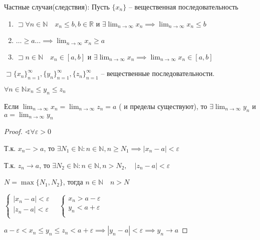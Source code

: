 \documentclass{book}
\newcommand\N{\ensuremath{\mathbb{N}}}
\newcommand\R{\ensuremath{\mathbb{R}}}
\theoremstyle{definition}
\begin{document}
    Частные случаи(следствия):
    Пусть $\{x_n\}$ -- вещественная последовательность
    \begin{enumerate}
        \item $\sqsupset \forall n\in \N \quad x_n\leqslant b, b\in \R$ и $\exists \lim_{n \to \infty} x_n \implies \lim_{n \to \infty} x_n\leqslant b$
        \item $\ldots \geqslant a \ldots \implies  \lim_{n \to \infty} x_n\geqslant a$
        \item $\sqsupset n\in \N \quad x_{n} \in[a,b]$ и $\exists \lim_{n \to \infty} x_n \implies \lim_{n \to \infty} x_n\in [a,b]$
    \end{enumerate}

    \begin{theorem}
        $\sqsupset \{x_n\}_{n=1}^{\infty }, \{y_{n} \}_{n=1}^{\infty }, \{z_n\}_{n=1}^{\infty }$ -- вещественные последовательности.

        $\forall n\in \N  x_{n} \leqslant y_{n} \leqslant z_n$

        Если $\lim_{n \to \infty} x_n = \lim_{n \to \infty}  z_n = a $ ( и пределы существуют), то $\exists \lim_{n \to \infty} y_n$ и $a = \lim_{n \to \infty} y_{n} $
    \end{theorem}
    \begin{proof}
        $\sphericalangle\forall  \varepsilon>0$

        Т.к. $x_n -> a$, то $\exists N_1\in \N : n\in \N , n\geqslant N_1 \implies \left| x_n-a \right| <\varepsilon$

        Т.к. $z_n \to  a$, то $\exists N_2\in \N :n\in \N , n>N_2, \quad\left| z_n-a \right| <\varepsilon$

        $N = \max\{N_1, N_2\}$, тогда $n\in \N \quad n>N$

        $\begin{cases}
            \left| x_n-a \right| <\varepsilon\\
            \left| z_n-a \right| <\varepsilon\\
        \end{cases}\quad \begin{cases}
            x_n> a-\varepsilon\\
            y_n<a+\varepsilon\\
        \end{cases}$

        $a-\varepsilon <x_n\leqslant y_{n} \leqslant z_n<a+\varepsilon \implies \left| y_n-a \right| <\varepsilon \implies y_n\to a$
    \end{proof}
    
\end{document}
